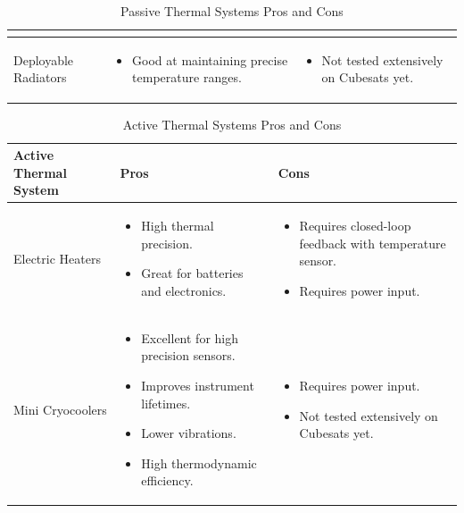 \documentclass{ece}
\begin{document}
\begin{table}[H]
\begin{tabular}{|p{}|p{}|p{}|}
\begin{itemize}
    \end{itemize}
    \\
\hline
    Deployable Radiators
    &
    \begin{itemize}
        \item Good at maintaining precise temperature ranges.
    \end{itemize}
    &
    \begin{itemize}
        \item Not tested extensively on Cubesats yet.
    \end{itemize}
    \\
\hline
\end{tabular}
\caption{Passive Thermal Systems Pros and Cons}
\label{tbl:Passive_Thermal_ProCon}
\end{table}

\begin{table}[H]
\centering
\begin{tabular}{|p{}|p{}|p{}|} 
\hline
\textbf{Active Thermal System} & \textbf{Pros} & \textbf{Cons}
\\
\hline
     Electric Heaters
     &
    \begin{itemize}
        \item High thermal precision.
        \item Great for batteries and electronics.
    \end{itemize}
    &
    \begin{itemize}
        \item Requires closed-loop feedback with temperature sensor.
        \item Requires power input.
    \end{itemize}
    \\
\hline
     Mini Cryocoolers
     &
    \begin{itemize}
        \item Excellent for high precision sensors.
        \item Improves instrument lifetimes.
        \item Lower vibrations.
        \item High thermodynamic efficiency.
    \end{itemize}
    &
        \begin{itemize}
        \item Requires power input.
        \item Not tested extensively on Cubesats yet.
    \end{itemize}
    \\
\hline
\end{tabular}
\caption{Active Thermal Systems Pros and Cons}
\label{tbl:Active_Thermal_ProCon}
\end{table}
\end{document}
